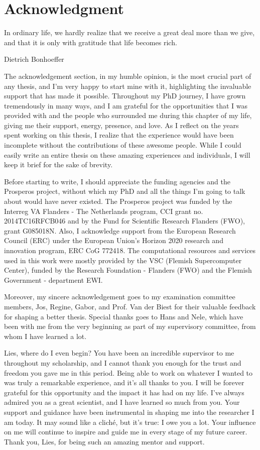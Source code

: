 \chapter*{Acknowledgment}                                  \label{ch:preface}

\epigraph{In ordinary life, we hardly realize that we receive a great deal more than we give, and that it is only with gratitude that life becomes rich.}{Dietrich Bonhoeffer}

The acknowledgement section, in my humble opinion, is the most crucial part of any thesis, and I'm very happy to start mine with it, highlighting the invaluable support that has made it possible. Throughout my PhD journey, I have grown tremendously in many ways, and I am grateful for the opportunities that I was provided with and the people who surrounded me during this chapter of my life, giving me their support, energy, presence, and love. As I reflect on the years spent working on this thesis, I realize that the experience would have been incomplete without the contributions of these awesome people. While I could easily write an entire thesis on these amazing experiences and individuals, I will keep it brief for the sake of brevity.

Before starting to write, I should appreciate the funding agencies and the Prosperos project, without which my PhD and all the things I'm going to talk about would have never existed. The Prosperos project was funded by the Interreg VA Flanders - The Netherlands program, CCI grant no. 2014TC16RFCB046 and by the Fund for Scientific Research Flanders (FWO), grant G085018N. Also, I acknowledge support from the European Research Council (ERC) under the European Union's Horizon 2020 research and innovation program, ERC CoG 772418. The computational resources and services used in this work were mostly provided by the VSC (Flemish Supercomputer Center), funded by the Research Foundation - Flanders (FWO) and the Flemish Government - department EWI. 

Moreover, my sincere acknowledgement goes to my examination committee members, Jos, Regine, Gabor, and Prof. Van der Biest for their valuable feedback for shaping a better thesis. Special thanks goes to Hans and Nele, which have been with me from the very beginning as part of my supervisory committee, from whom I have learned a lot.

Lies, where do I even begin? You have been an incredible supervisor to me throughout my scholarship, and I cannot thank you enough for the trust and freedom you gave me in this period. Being able to work on whatever I wanted to was truly a remarkable experience, and it's all thanks to you. I will be forever grateful for this opportunity and the impact it has had on my life. I've always admired you as a great scientist, and I have learned so much from you. Your support and guidance have been instrumental in shaping me into the researcher I am today. It may sound like a cliché, but it's true: I owe you a lot. Your influence on me will continue to inspire and guide me in every stage of my future career. Thank you, Lies, for being such an amazing mentor and support.

